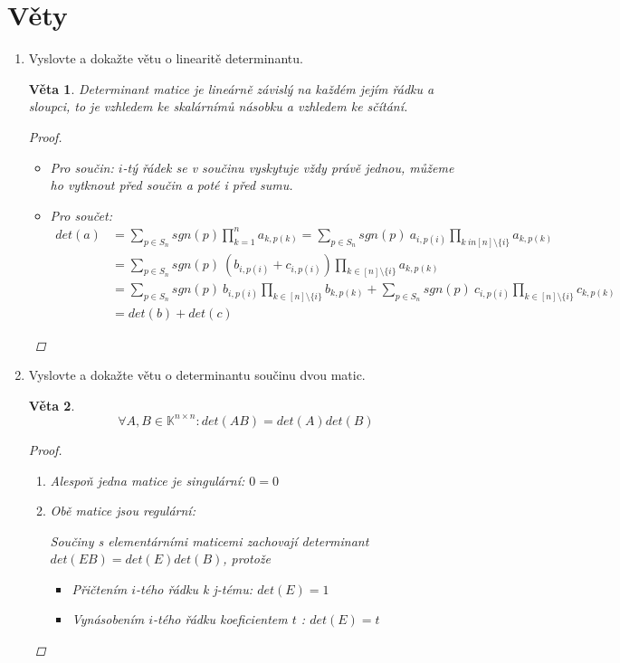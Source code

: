 \documentclass[10pt,a4paper]{article}
\theoremstyle{plain}
\newtheorem{veta}{Věta}
\begin{document}
\part{Věty}
\begin{enumerate}
\item Vyslovte a dokažte větu o linearitě determinantu.

\begin{veta}

Determinant matice je lineárně závislý na každém jejím řádku a sloupci, to je vzhledem ke skalárnímů násobku a vzhledem ke sčítání.

\begin{proof}
\begin{itemize}
\item Pro součin: $i$-tý řádek se v součinu vyskytuje vždy právě jednou, můžeme ho vytknout před součin a poté i před sumu.
\item Pro součet:
\begin{align*}
det(a) &= \sum_{p \in S_n} sgn(p) \prod_{k=1}^n a_{k, p(k)} 
		= \sum_{p \in S_n} sgn(p)\ a_{i,p(i)} \prod_{k\ in [n] \setminus \{i\}} a_{k, p(k)} \\
	   &=  \sum_{p \in S_n} sgn(p)\ (b_{i,p(i)} + c_{i,p(i)}) \prod_{k \in [n] \setminus \{i\}} a_{k, p(k)} \\
	   &=  \sum_{p \in S_n} sgn(p)\ b_{i,p(i)} \prod_{k \in [n] \setminus \{i\}} b_{k, p(k)} + \sum_{p \in S_n} sgn(p)\  c_{i,p(i)} \prod_{k \in [n] \setminus \{i\}} c_{k, p(k)} \\
	   &= det(b) + det(c)
\end{align*}
\end{itemize}
\end{proof}
\end{veta}



\item Vyslovte a dokažte větu o determinantu součinu dvou matic.

\begin{veta}
\[ \forall A,B \in \mathbb{K}^{n \times n}: det(AB) = det(A)det(B) \]
\begin{proof}
\begin{enumerate}[label=(\alph*)]
\item Alespoň jedna matice je singulární: $0 = 0$
\item Obě matice jsou regulární: 

Součiny s elementárními maticemi zachovají determinant $det(EB)=det(E)det(B)$, protože \begin{itemize}
\item Přičtením $i$-tého řádku k j-tému: $det(E) = 1$
\item Vynásobením $i$-tého řádku koeficientem $t$ : $det(E) = t$
\end{itemize}


\end{enumerate}
\end{proof}
\end{veta}
\end{enumerate}
\end{document}
